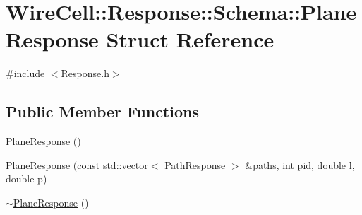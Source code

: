 \hypertarget{struct_wire_cell_1_1_response_1_1_schema_1_1_plane_response}{}\section{Wire\+Cell\+:\+:Response\+:\+:Schema\+:\+:Plane\+Response Struct Reference}
\label{struct_wire_cell_1_1_response_1_1_schema_1_1_plane_response}


{\ttfamily \#include $<$Response.\+h$>$}

\subsection*{Public Member Functions}
\begin{DoxyCompactItemize}
\item 
\hyperlink{struct_wire_cell_1_1_response_1_1_schema_1_1_plane_response_a5ee2c9c93a70c5b773283819996f4126}{Plane\+Response} ()
\item 
\hyperlink{struct_wire_cell_1_1_response_1_1_schema_1_1_plane_response_a5b347d4aefec38cb70ab1bf33d77d2af}{Plane\+Response} (const std\+::vector$<$ \hyperlink{struct_wire_cell_1_1_response_1_1_schema_1_1_path_response}{Path\+Response} $>$ \&\hyperlink{struct_wire_cell_1_1_response_1_1_schema_1_1_plane_response_a3c93c99a96e85b80eb298d12356d3e50}{paths}, int pid, double l, double p)
\item 
\hyperlink{struct_wire_cell_1_1_response_1_1_schema_1_1_plane_response_ac42641407cc049e00a7b86603bd3d782}{$\sim$\+Plane\+Response} ()
\end{DoxyCompactItemize}
